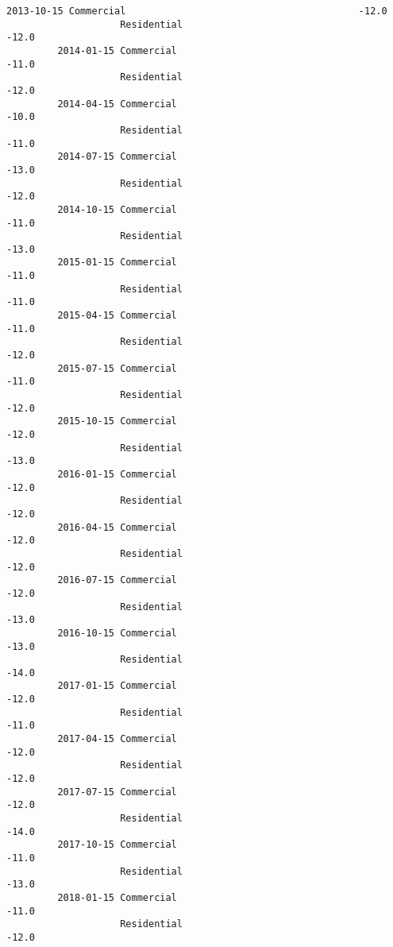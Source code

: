 \documentclass[11pt]{article}
\begin{document}
\begin{Verbatim}[commandchars=\\\{\}]
         2013-10-15 Commercial                                         -12.0   
                    Residential                                        -12.0   
         2014-01-15 Commercial                                         -11.0   
                    Residential                                        -12.0   
         2014-04-15 Commercial                                         -10.0   
                    Residential                                        -11.0   
         2014-07-15 Commercial                                         -13.0   
                    Residential                                        -12.0   
         2014-10-15 Commercial                                         -11.0   
                    Residential                                        -13.0   
         2015-01-15 Commercial                                         -11.0   
                    Residential                                        -11.0   
         2015-04-15 Commercial                                         -11.0   
                    Residential                                        -12.0   
         2015-07-15 Commercial                                         -11.0   
                    Residential                                        -12.0   
         2015-10-15 Commercial                                         -12.0   
                    Residential                                        -13.0   
         2016-01-15 Commercial                                         -12.0   
                    Residential                                        -12.0   
         2016-04-15 Commercial                                         -12.0   
                    Residential                                        -12.0   
         2016-07-15 Commercial                                         -12.0   
                    Residential                                        -13.0   
         2016-10-15 Commercial                                         -13.0   
                    Residential                                        -14.0   
         2017-01-15 Commercial                                         -12.0   
                    Residential                                        -11.0   
         2017-04-15 Commercial                                         -12.0   
                    Residential                                        -12.0   
         2017-07-15 Commercial                                         -12.0   
                    Residential                                        -14.0   
         2017-10-15 Commercial                                         -11.0   
                    Residential                                        -13.0   
         2018-01-15 Commercial                                         -11.0   
                    Residential                                        -12.0   
         

\end{Verbatim}
\end{document}
